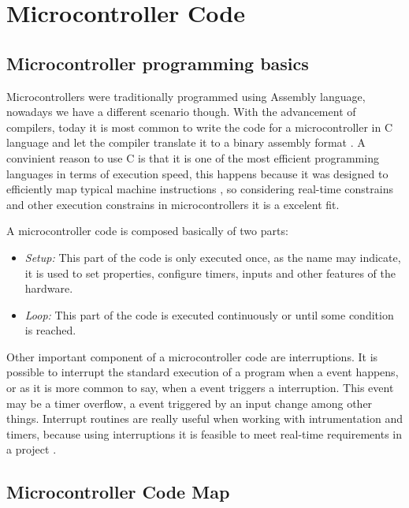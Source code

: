 \section{Microcontroller Code}\label{sec:microcontroller-code}

	\subsection{Microcontroller programming basics}\label{ssec:microcontroller-programming-basics}
		Microcontrollers were traditionally programmed using Assembly language, nowadays we have a different scenario though. With the advancement of compilers, today it is most common to write the code for a microcontroller in C language and let the compiler translate it to a binary assembly format \cite{Mazidi:2010:AME:1824214}. A convinient reason to use C is that it is one of the most efficient programming languages in terms of execution speed, this happens because it was designed to efficiently map typical machine instructions \cite{kernighan2006c}, so considering real-time constrains and other execution constrains in microcontrollers it is a excelent fit.
		
		\par
		A microcontroller code is composed basically of two parts:
		
		\begin{itemize}
			\item \textit{Setup: } This part of the code is only executed once, as the name may indicate, it is used to set properties, configure timers, inputs and other features of the hardware.
			\item \textit{Loop: } This part of the code is executed continuously or until some condition is reached. 
		\end{itemize}
		
		\par
		
		Other important component of a microcontroller code are interruptions. It is possible to interrupt the standard execution of a program when a event happens, or as it is more common to say, when a event triggers a interruption. This event may be a timer overflow, a event triggered by an input change among other things. Interrupt routines are really useful when working with intrumentation and timers, because using interruptions it is feasible to meet real-time requirements in a project \cite{mukaro1999microcontroller}.
		
	\subsection{Microcontroller Code Map}\label{sec:microcontroller-code-map}
	
